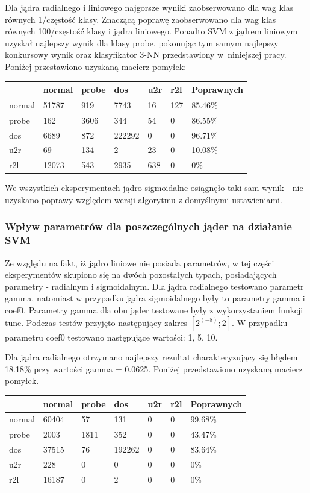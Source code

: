 \documentclass[a4paper, 12pt]{article}
\begin{document}
Dla jądra radialnego i liniowego najgorsze wyniki zaobserwowano dla wag klas równych 1/częstość klasy. Znaczącą poprawę zaobserwowano dla wag klas równych 100/częstość klasy i jądra liniowego. Ponadto SVM z jądrem liniowym uzyskał najlepszy wynik dla klasy probe, pokonując tym samym najlepszy konkursowy wynik oraz klasyfikator 3-NN przedstawiony w~niniejszej pracy. Poniżej przestawiono uzyskaną macierz pomyłek:
\begin{table}[H]
\centering
\begin{tabular}{ | l | l | l | l | l | l | l | } \hline
	& normal & probe & dos 	& u2r 	& r2l 	& Poprawnych	\\ \hline
normal &  51787 &  919 & 7743  &  16 & 127  & 85.46\% \\ \hline
probe  &  162 & 3606 &   344 &   54 &   0 & 86.55\% \\ \hline
dos    &  6689 &  872 & 222292 &   0 &  0 & 96.71\% \\ \hline
u2r    &    69 &  134 &  2 &  23 &  0 & 10.08\% \\ \hline
r2l    &  12073 &  543 &   2935 & 638 &  0 & 0\% \\ \hline
\end{tabular} 
\end{table}
We wszystkich eksperymentach jądro sigmoidalne osiągnęło taki sam wynik - nie uzyskano poprawy względem wersji algorytmu z domyślnymi ustawieniami.

\subsubsection{Wpływ parametrów dla poszczególnych jąder na działanie SVM}
Ze względu na fakt, iż jądro liniowe nie posiada parametrów, w tej części eksperymentów skupiono się na dwóch pozostałych typach, posiadających parametry - radialnym i sigmoidalnym.
Dla jądra radialnego testowano parametr gamma, natomiast w przypadku jądra sigmoidalnego były to parametry gamma i coef0. 
Parametry gamma dla obu jąder testowane były z wykorzystaniem funkcji tune. Podczas testów przyjęto następujący zakres $[2^{(-8)};2]$. W przypadku parametru coef0 testowano następujące wartości: 1, 5, 10.

Dla jądra radialnego otrzymano najlepszy rezultat charakteryzujący się błędem 18.18\% przy wartości gamma = 0.0625. Poniżej przedstawiono uzyskaną macierz pomyłek.

\begin{table}[H]
\centering
\begin{tabular}{ | l | l | l | l | l | l | l | } \hline
	& normal & probe & dos 	& u2r 	& r2l 	& Poprawnych	\\ \hline
normal &  60404 &   57 &  131  & 0  &  0 & 99.68\% \\ \hline
probe  &  2003 & 1811  &  352  &  0 & 0 & 43.47\% \\ \hline
dos    &  37515  &  76 & 192262 &  0  & 0 & 83.64\% \\ \hline
u2r    &    228   &  0   &   0 &  0 & 0 & 0\% \\ \hline
r2l    &  16187   &  0   &   2 &  0 &  0 & 0\% \\ \hline
\end{tabular} 
\end{table}
\end{document}
